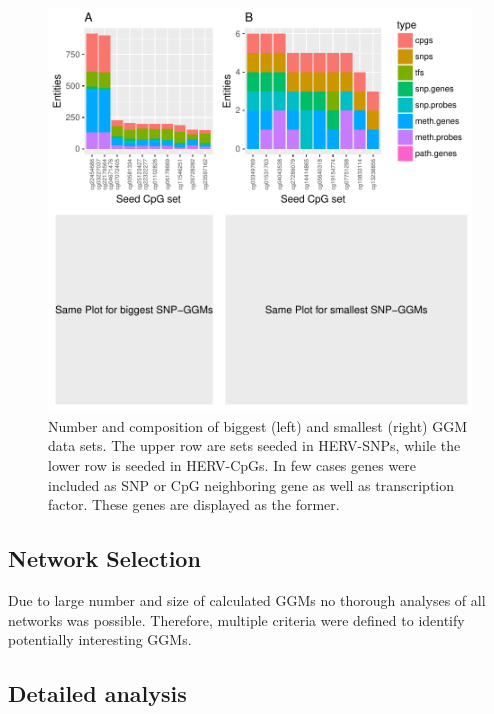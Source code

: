 \documentclass[a4paper,12pt,twoside,openright]{report}
\begin{document}

\begin{figure}[tb]
	\includegraphics[scale = 1, keepaspectratio = true]{../figures/hervS2_ggm_entity_bar}  
	\caption{Number and composition of biggest (left) and smallest (right) GGM data sets. The upper row are sets seeded in HERV-SNPs, while the lower row is seeded in HERV-CpGs. In few cases genes were included as SNP or CpG neighboring gene as well as transcription factor. These genes are displayed as the former.}
    \label{fig:ggm.entity.bar}
\end{figure}


\subsection{Network Selection}
\label{Results:Network Selection}
Due to large number and size of calculated GGMs no thorough analyses of all networks was possible. Therefore, multiple criteria were defined to identify potentially interesting GGMs.

\subsection{Detailed analysis}
\label{Results:Detailed analysis}
\end{document}

